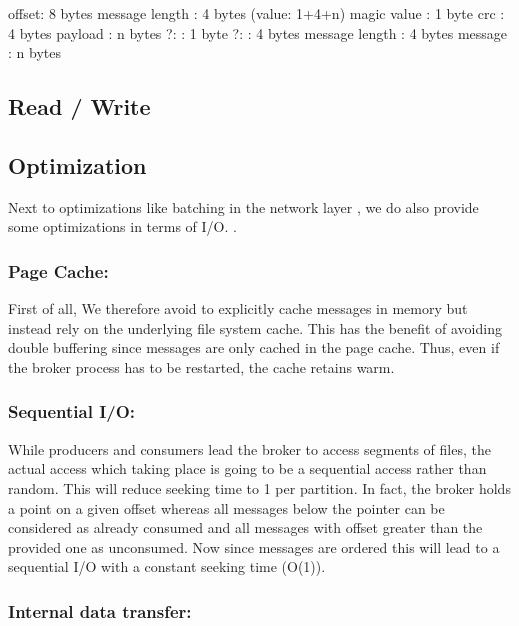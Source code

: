 offset: 8 bytes
message length : 4 bytes (value: 1+4+n) 
magic value  : 1 byte
crc            : 4 bytes
payload        : n bytes
    ?:              : 1 byte
    ?:              : 4 bytes
    message length  : 4 bytes
    message         : n bytes

\subsection{Read / Write}

\subsection{Optimization}

Next to optimizations like batching in the network layer ,
we do also provide some optimizations in terms of I/O. .

\subsubsection{Page Cache:}

First of all, We therefore avoid to explicitly cache messages in memory but
instead rely on the underlying file system cache. This has the benefit of
avoiding double buffering since messages are only cached in the page cache.
Thus, even if the broker process has to be restarted, the cache retains warm.


\subsubsection{Sequential I/O: }

While producers and consumers lead the broker to access
segments of files, the actual access which taking place is going to be a
sequential access rather than random. This will reduce seeking time to 1 per
partition. In fact, the broker holds a point on a given offset whereas all
messages below the pointer can be considered as already consumed and all
messages with offset greater than the provided one as unconsumed. Now since
messages are ordered this will lead to a sequential I/O with a constant seeking
time (O(1)).


\subsubsection{Internal data transfer:}

